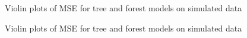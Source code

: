 \documentclass[
  12pt,
  letterpaper,
  DIV=11,
  numbers=noendperiod]{scrartcl}
\begin{document}
\begin{figure}[H]


\caption{\label{fig-sim1-rf-fit}Violin plots of MSE for tree and forest
models on simulated data}

\end{figure}%

\begin{figure}[H]


\caption{\label{fig-sim1-mse}Violin plots of MSE for tree and forest
models on simulated data}

\end{figure}%
\end{document}
